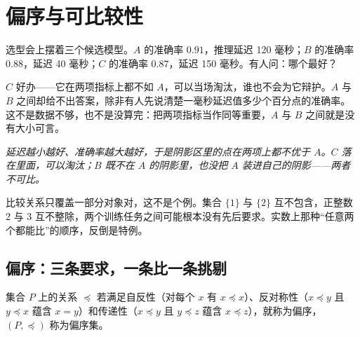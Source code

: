 \section{偏序与可比较性}
\label{sec:01-Mathematical-Language/02-Sets-Relations-Functions/03}

选型会上摆着三个候选模型。\(A\) 的准确率 \(0.91\)，推理延迟 120 毫秒；\(B\) 的准确率 \(0.88\)，延迟 40 毫秒；\(C\) 的准确率 \(0.87\)，延迟 150 毫秒。有人问：哪个最好？

\(C\) 好办——它在两项指标上都不如 \(A\)，可以当场淘汰，谁也不会为它辩护。\(A\) 与 \(B\) 之间却给不出答案，除非有人先说清楚一毫秒延迟值多少个百分点的准确率。这不是数据不够，也不是没算完：把两项指标当作同等重要，\(A\) 与 \(B\) 之间就是没有大小可言。

\begin{center}

\emph{延迟越小越好、准确率越大越好，于是阴影区里的点在两项上都不优于 \(A\)。\(C\) 落在里面，可以淘汰；\(B\) 既不在 \(A\) 的阴影里，也没把 \(A\) 装进自己的阴影——两者不可比。}
\end{center}

比较关系只覆盖一部分对象对，这不是个例。集合 \(\{1\}\) 与 \(\{2\}\) 互不包含，正整数 2 与 3 互不整除，两个训练任务之间可能根本没有先后要求。实数上那种``任意两个都能比''的顺序，反倒是特例。

\subsection{偏序：三条要求，一条比一条挑剔}

\begin{definition}
集合 \(P\) 上的关系 \(\preceq\) 若满足自反性（对每个 \(x\) 有 \(x\preceq x\)）、反对称性（\(x\preceq y\) 且 \(y\preceq x\) 蕴含 \(x=y\)）和传递性（\(x\preceq y\) 且 \(y\preceq z\) 蕴含 \(x\preceq z\)），就称为偏序，\((P,\preceq)\) 称为偏序集。
\end{definition}

